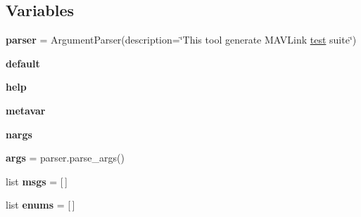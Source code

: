 \subsection*{Variables}
\begin{DoxyCompactItemize}
\item 
\mbox{\label{namespacepymavlink_1_1generator_1_1mavtestgen_ab620e2ff96a457c9698e3708c7316838}} 
{\bfseries parser} = Argument\+Parser(description=\char`\"{}This tool generate M\+A\+V\+Link \hyperlink{classtest}{test} suite\char`\"{})
\item 
\mbox{\label{namespacepymavlink_1_1generator_1_1mavtestgen_ab45eb25c7f20d761a4469d739be313ce}} 
{\bfseries default}
\item 
\mbox{\label{namespacepymavlink_1_1generator_1_1mavtestgen_a226f47485edb2f3f791d5167a2629b40}} 
{\bfseries help}
\item 
\mbox{\label{namespacepymavlink_1_1generator_1_1mavtestgen_a91aed16f2cce928c890e7723fdfca8bc}} 
{\bfseries metavar}
\item 
\mbox{\label{namespacepymavlink_1_1generator_1_1mavtestgen_ab3c4c9ffb18228eea8f7518c2228cc70}} 
{\bfseries nargs}
\item 
\mbox{\label{namespacepymavlink_1_1generator_1_1mavtestgen_a223b963924b8f6511f130738e636ae5a}} 
{\bfseries args} = parser.\+parse\+\_\+args()
\item 
\mbox{\label{namespacepymavlink_1_1generator_1_1mavtestgen_a57c1b5445619b3fe490684298c5c36c6}} 
list {\bfseries msgs} = \mbox{[}$\,$\mbox{]}
\item 
\mbox{\label{namespacepymavlink_1_1generator_1_1mavtestgen_a53aa39d8783bf0f9d981719593561c9e}} 
list {\bfseries enums} = \mbox{[}$\,$\mbox{]}
\item 
\mbox{\label{namespacepymavlink_1_1generator_1_1mavtestgen_a107cb672cec756bd43d417aadf4e1892}} 

\end{DoxyCompactItemize}
